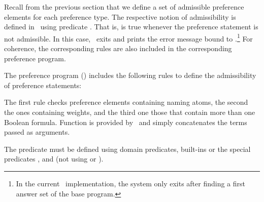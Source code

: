 Recall from the previous section that we define a set of admissible preference elements for each preference type.
The respective notion of admissibility is defined in \asprin\ using predicate .
That is,  is true whenever the preference statement is not admissible.
In this case, \asprin\ exits and prints the error message bound to .\footnote{%
In the current \asprin\ implementation, 
the system only exits after finding a first answer set of the base program.}
For coherence, the corresponding rules are also included in the corresponding preference program.
\begin{example}
The preference program ()
includes the following rules to define the admissibility of  preference statements:
%

%
The first rule checks preference elements containing naming atoms, 
the second the ones containing weights, 
and the third one those that contain more than one Boolean formula.
Function  is provided by \asprin\ and simply concatenates the terms passed as arguments.
\end{example}

\begin{note}
The predicate  must be defined using domain predicates, built-ins or the special 
predicates ,  and  
(not using  or ).
\end{note}



